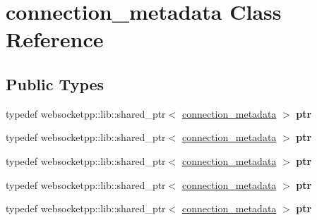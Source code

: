 \hypertarget{classconnection__metadata}{}\section{connection\+\_\+metadata Class Reference}
\label{classconnection__metadata}
\subsection*{Public Types}
\begin{DoxyCompactItemize}
\item 
\mbox{\label{classconnection__metadata_addf7404d76d8f9754aa128a85dc9a757}} 
typedef websocketpp\+::lib\+::shared\+\_\+ptr$<$ \mbox{\hyperlink{classconnection__metadata}{connection\+\_\+metadata}} $>$ {\bfseries ptr}
\item 
\mbox{\label{classconnection__metadata_addf7404d76d8f9754aa128a85dc9a757}} 
typedef websocketpp\+::lib\+::shared\+\_\+ptr$<$ \mbox{\hyperlink{classconnection__metadata}{connection\+\_\+metadata}} $>$ {\bfseries ptr}
\item 
\mbox{\label{classconnection__metadata_addf7404d76d8f9754aa128a85dc9a757}} 
typedef websocketpp\+::lib\+::shared\+\_\+ptr$<$ \mbox{\hyperlink{classconnection__metadata}{connection\+\_\+metadata}} $>$ {\bfseries ptr}
\item 
\mbox{\label{classconnection__metadata_addf7404d76d8f9754aa128a85dc9a757}} 
typedef websocketpp\+::lib\+::shared\+\_\+ptr$<$ \mbox{\hyperlink{classconnection__metadata}{connection\+\_\+metadata}} $>$ {\bfseries ptr}
\item 
\mbox{\label{classconnection__metadata_addf7404d76d8f9754aa128a85dc9a757}} 
typedef websocketpp\+::lib\+::shared\+\_\+ptr$<$ \mbox{\hyperlink{classconnection__metadata}{connection\+\_\+metadata}} $>$ {\bfseries ptr}
\end{DoxyCompactItemize}
